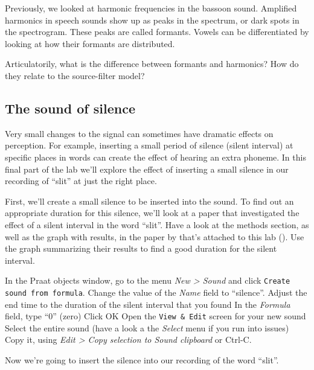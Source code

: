 \documentclass[a4paper, 9pt]{article}
\begin{document}
Previously, we looked at harmonic frequencies in the bassoon sound. Amplified harmonics in speech sounds show up as peaks in the spectrum, or dark spots in the spectrogram. These peaks are called formants. Vowels can be differentiated by looking at how their formants are distributed.

\begin{exercise}
\askstar Articulatorily, what is the difference between formants and harmonics? How do they relate to the source-filter model?
\end{exercise}

\subsection{The sound of silence}\label{the-sound-of-silence}

Very small changes to the signal can sometimes have dramatic effects on
perception. For example, inserting a small period of silence (silent
interval) at specific places in words can create the effect of hearing
an extra phoneme. In this final part of the lab we'll explore the effect
of inserting a small silence in our recording of ``slit'' at just the
right place.

First, we'll create a small silence to be inserted into the
 sound. To find out an appropriate duration for this
silence, we'll look at a paper that investigated the effect of a silent
interval in the word ``slit''. Have a look at the methods section, as
well as the graph with results, in the paper by \cite{Marcus1978} that's
attached to this lab (). Use the graph summarizing their
results to find a good duration for the silent interval.

\begin{exercise}
\action In the Praat objects window, go to the menu \emph{New > Sound} and click \texttt{Create sound from formula}.
\action Change the value of the \emph{Name} field to ``silence''. 
\action Adjust the end time to the duration of the silent interval that you found
\action In the \emph{Formula} field, type ``0'' (zero)
\action Click OK
\action Open the \texttt{View \& Edit} screen for your new sound
\action Select the entire sound (have a look a the \emph{Select} menu if you run into issues)
\action Copy it, using \emph{Edit > Copy selection to Sound clipboard} or Ctrl-C.
\end{exercise}

Now we're going to insert the silence into our recording of the word
``slit''.
\end{document}
